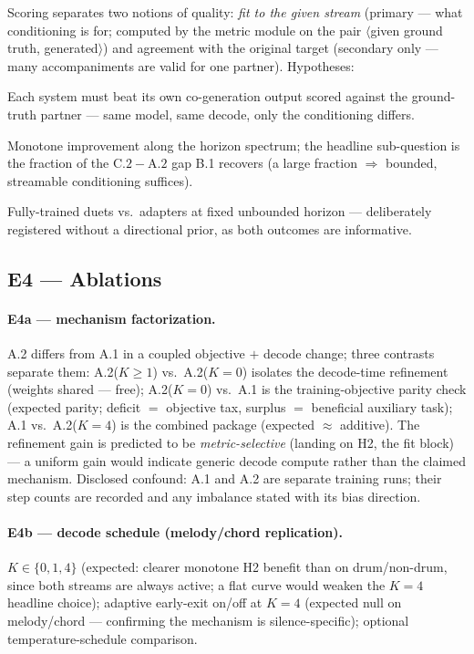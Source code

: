 \documentclass[11pt]{article}
\begin{document}
Scoring separates two notions of quality: \emph{fit to the given
stream} (primary --- what conditioning is for; computed by the metric
module on the pair $\langle$given ground truth, generated$\rangle$)
and agreement with the original target (secondary only --- many
accompaniments are valid for one partner). Hypotheses:
\begin{description}[nosep]
  \item[H-E3.1 (sanity gate, within-family).] Each system must beat
    its own co-generation output scored against the ground-truth
    partner --- same model, same decode, only the conditioning
    differs.
  \item[H-E3.2 (dose--response).] Monotone improvement along the
    horizon spectrum; the headline sub-question is the fraction of the
    $\mathrm{C.2}-\mathrm{A.2}$ gap B.1 recovers (a large fraction
    $\Rightarrow$ bounded, streamable conditioning suffices).
  \item[H-E3.3 (training vs.\ adapters).] Fully-trained duets vs.\
    adapters at fixed unbounded horizon --- deliberately registered
    without a directional prior, as both outcomes are informative.
\end{description}

\subsection{E4 --- Ablations}

\paragraph{E4a --- mechanism factorization.} A.2 differs from A.1 in a
coupled objective $+$ decode change; three contrasts separate them:
A.2($K{\ge}1$) vs.\ A.2($K{=}0$) isolates the decode-time refinement
(weights shared --- free); A.2($K{=}0$) vs.\ A.1 is the
training-objective parity check (expected parity; deficit $=$
objective tax, surplus $=$ beneficial auxiliary task); A.1 vs.\
A.2($K{=}4$) is the combined package (expected $\approx$ additive).
The refinement gain is predicted to be \emph{metric-selective}
(landing on H2, the fit block) --- a uniform gain would indicate
generic decode compute rather than the claimed mechanism. Disclosed
confound: A.1 and A.2 are separate training runs; their step counts
are recorded and any imbalance stated with its bias direction.

\paragraph{E4b --- decode schedule (melody/chord replication).}
$K \in \{0, 1, 4\}$ (expected: clearer monotone H2 benefit than on
drum/non-drum, since both streams are always active; a flat curve
would weaken the $K{=}4$ headline choice); adaptive early-exit on/off
at $K{=}4$ (expected null on melody/chord --- confirming the mechanism
is silence-specific); optional temperature-schedule comparison.
\end{document}
